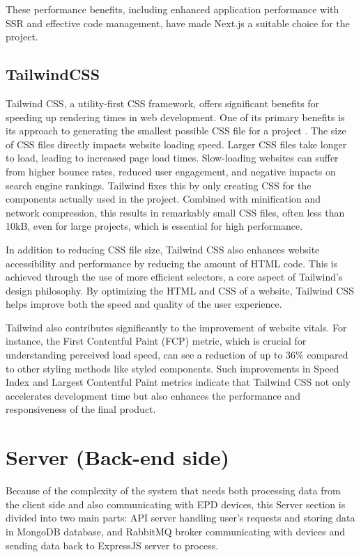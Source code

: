 \documentclass[../Main.tex]{subfiles}
\begin{document}
These performance benefits, including enhanced application performance with SSR and effective code management, have made Next.js a suitable choice for the project.
\subsection{TailwindCSS}
Tailwind CSS, a utility-first CSS framework, offers significant benefits for speeding up rendering times in web development. One of its primary benefits is its approach to generating the smallest possible CSS file for a project \cite{tailwind}. The size of CSS files directly impacts website loading speed. Larger CSS files take longer to load, leading to increased page load times. Slow-loading websites can suffer from higher bounce rates, reduced user engagement, and negative impacts on search engine rankings. Tailwind fixes this by only creating CSS for the components actually used in the project. Combined with minification and network compression, this results in remarkably small CSS files, often less than 10kB, even for large projects, which is essential for high performance\cite{tailwind-1}.

In addition to reducing CSS file size, Tailwind CSS also enhances website accessibility and performance by reducing the amount of HTML code. This is achieved through the use of more efficient selectors, a core aspect of Tailwind's design philosophy. By optimizing the HTML and CSS of a website, Tailwind CSS helps improve both the speed and quality of the user experience.

Tailwind also contributes significantly to the improvement of website vitals. For instance, the First Contentful Paint (FCP) metric, which is crucial for understanding perceived load speed, can see a reduction of up to 36\% compared to other styling methods like styled components\cite{tailwind36}. Such improvements in Speed Index and Largest Contentful Paint metrics indicate that Tailwind CSS not only accelerates development time but also enhances the performance and responsiveness of the final product.

\section{Server (Back-end side)}
Because of the complexity of the system that needs both processing data from the client side and also communicating with \gls{EPD} devices, this Server section is divided into two main parts: API server handling user's requests and storing data in MongoDB database, and RabbitMQ broker communicating with devices and sending data back to ExpressJS server to process. 
\end{document}
